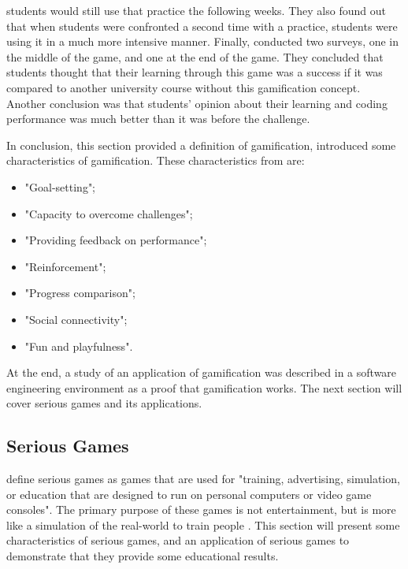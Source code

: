 \documentclass{l4proj}
\begin{document}
students would still use that practice the following weeks. They also found out that when students were confronted a second time with a practice, 
students were using it in a much more intensive manner. Finally, \citet{akpolat_enhancing_2014} conducted two surveys, one in the middle of the game, and one at the end of the game.
They concluded that students thought that their learning through this game was a success if it was compared to another university course without this gamification concept.
Another conclusion was that students' opinion about their learning and coding performance was much better than it was before the challenge.

In conclusion, this section provided a definition of gamification, introduced some characteristics of gamification. 
These characteristics from \citet{cugelman_gamification:_2013} are:
\begin{itemize}
    \item "Goal-setting";
    \item "Capacity to overcome challenges";
    \item "Providing feedback on performance";
    \item "Reinforcement";
    \item "Progress comparison";
    \item "Social connectivity";
    \item "Fun and playfulness".
\end{itemize}
At the end, a study of an application of gamification was described in a software engineering environment as a proof that gamification works.
The next section will cover serious games and its applications.

\subsection{Serious Games}

\citet{susi_serious_2007} define serious games as games that are used for "training, advertising, simulation, or education that are designed to run
on personal computers or video game consoles". The primary purpose of these games is not entertainment, but is more like a simulation of the real-world
to train people \citep{susi_serious_2007}. This section will present some characteristics of serious games, 
and an application of serious games to demonstrate that they provide some educational results.
\end{document}
